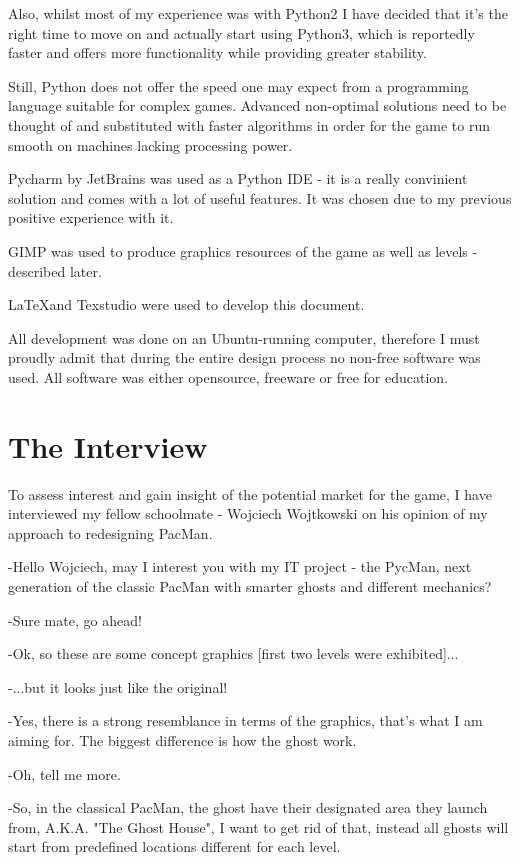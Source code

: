 \documentclass[11pt,a4paper]{report}
\begin{document}
			Also, whilst most of my experience was with Python2 I have decided that it's the right time to move on and actually start using Python3, which is reportedly faster and offers more functionality while providing greater stability.
			
			Still, Python does not offer the speed one may expect from a programming language suitable for complex games. Advanced non-optimal solutions need to be thought of and substituted with faster algorithms in order for the game to run smooth on machines lacking processing power.
			
			Pycharm by JetBrains was used as a Python IDE - it is a really convinient solution and comes with a lot of useful features. It was chosen due to my previous positive experience with it.
			
			GIMP was used to produce graphics resources of the game as well as levels - described later.
			
			\LaTeX and Texstudio were used to develop this document.
			
			All development was done on an Ubuntu-running computer, therefore	
			I must proudly admit that during the entire design process no non-free software was used. All software was either opensource, freeware or free for education.
			
		\section{The Interview}
			To assess interest and gain insight of the potential market for the game, I have interviewed my fellow schoolmate - Wojciech Wojtkowski on his opinion of my approach to redesigning PacMan.
			
			-Hello Wojciech, may I interest you with my IT project - the PycMan, next generation of the classic PacMan with smarter ghosts and different mechanics?
			
			-Sure mate, go ahead!
			
			-Ok, so these are some concept graphics [first two levels were exhibited]...
			
			-...but it looks just like the original!
			
			-Yes, there is a strong resemblance in terms of the graphics, that's what I am aiming for. The biggest difference is how the ghost work.
			
			-Oh, tell me more.
			
			-So, in the classical PacMan, the ghost have their designated area they launch from, A.K.A. "The Ghost House", I want to get rid of that, instead all ghosts will start from predefined locations different for each level.
			
\end{document}
